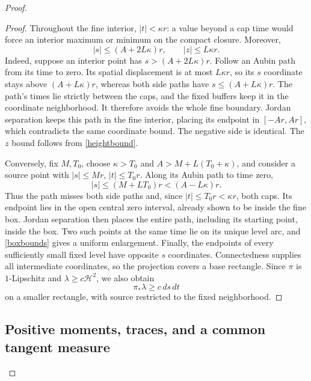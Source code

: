 \documentclass[11pt]{article}
\newcommand{\HH}{\mathcal H}
\begin{document}
\begin{proof}
\begin{proof}
Throughout the fine interior, $|t|<\kappa r$: a value beyond a cap time would force an interior maximum or minimum on the compact closure. Moreover,
\begin{equation}\label{boxbounds}
 |s|\le(A+2L\kappa)r,\qquad |z|\le L\kappa r.
\end{equation}
Indeed, suppose an interior point has $s>(A+2L\kappa)r$. Follow an Aubin path from its time to zero. Its spatial displacement is at most $L\kappa r$, so its $s$ coordinate stays above $(A+L\kappa)r$, whereas both side paths have $s\le(A+L\kappa)r$. The path's times lie strictly between the caps, and the fixed buffers keep it in the coordinate neighborhood. It therefore avoids the whole fine boundary. Jordan separation keeps this path in the fine interior, placing its endpoint in $[-Ar,Ar]$, which contradicts the same coordinate bound. The negative side is identical. The $z$ bound follows from \eqref{heightbound}.

Conversely, fix $M,T_0$, choose $\kappa>T_0$ and $A>M+L(T_0+\kappa)$, and consider a source point with $|s|\le Mr$, $|t|\le T_0r$. Along its Aubin path to time zero,
\[
 |s|\le (M+LT_0)r<(A-L\kappa)r.
\]
Thus the path misses both side paths and, since $|t|\le T_0r<\kappa r$, both caps. Its endpoint lies in the open central zero interval, already shown to be inside the fine box. Jordan separation then places the entire path, including its starting point, inside the box. Two such points at the same time lie on its unique level arc, and \eqref{boxbounds} gives a uniform enlargement. Finally, the endpoints of every sufficiently small fixed level have opposite $s$ coordinates. Connectedness supplies all intermediate coordinates, so the projection covers a base rectangle. Since $\pi$ is $1$-Lipschitz and $\lambda\ge c\HH^2$, we also obtain
\begin{equation}\label{basearealower}
 \pi_*\lambda\ge c\,ds\,dt
\end{equation}
on a smaller rectangle, with source restricted to the fixed neighborhood.
\end{proof}

\subsection{Positive moments, traces, and a common tangent measure}

\end{proof}
\end{document}
